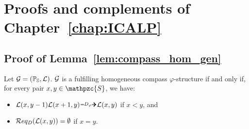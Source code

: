 \chapter{Proofs and complements of Chapter~\ref{chap:ICALP}}
\minitoc\mtcskip

\section{Proof of Lemma~\ref{lem:compass_hom_gen}}\label{proof:lem:compass_hom_gen}

\begin{lemma*}[\ref{lem:compass_hom_gen}]
Let $\mathcal{G}=(\mathbb{P}_{\mathbb{S}},\mathcal{L})$. $\mathcal{G}$ is a fulfilling homogeneous compass $\varphi$-structure if and only if, for every pair $x,y \in \mathpzc{S}$,  we have: 
\begin{itemize}
    \item $\cL(x,y-1)\cL(x+1, y)\genDphi \cL(x, y)$ if $x<y$, and 
    \item $\mathcal{R} eq_D(\mathcal{L}(x,y))=\emptyset$ if $x=y$.
\end{itemize}
\end{lemma*}

